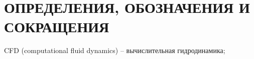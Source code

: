 \section*{ОПРЕДЕЛЕНИЯ, ОБОЗНАЧЕНИЯ И СОКРАЩЕНИЯ}

CFD (computational fluid dynamics) -- вычислительная гидродинамика;


\pagebreak